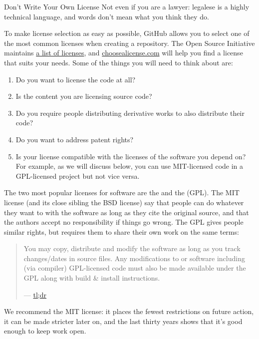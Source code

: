 \begin{aside}{Don't Write Your Own License}
  Not even if you are a lawyer:
  legalese is a highly technical language,
  and words don't mean what you think they do.
\end{aside}

To make license selection as easy as possible,
GitHub allows you to select one of the most common licenses when creating a repository.
The Open Source Initiative maintains \href{http://opensource.org/licenses}{a list of licenses},
and \href{http://choosealicense.com/}{choosealicense.com} will help you find a license that suits your needs.
Some of the things you will need to think about are:

\begin{enumerate}
\item
  Do you want to license the code at all?
\item
  Is the content you are licensing source code?
\item
  Do you require people distributing derivative works to also distribute their code?
\item
  Do you want to address patent rights?
\item
  Is your license compatible with the licenses of the software you depend on?
  For example, as we will discuss below,
  you can use MIT-licensed code in a GPL-licensed project but not vice versa.
\end{enumerate}

The two most popular licenses for software are
the  and the  (GPL).
The MIT license (and its close sibling the BSD license)
say that people can do whatever they want to with the software as long as they cite the original source,
and that the authors accept no responsibility if things go wrong.
The GPL gives people similar rights,
but requires them to share their own work on the same terms:

\begin{quote}
You may copy, distribute and modify the software as long as you track changes/dates in source files.
Any modifications to or software including (via compiler) GPL-licensed code must also be made available under the GPL
along with build \& install instructions.

--- \href{https://tldrlegal.com/license/gnu-general-public-license-v3-(gpl-3)}{tl;dr}
\end{quote}

We recommend the MIT license:
it places the fewest restrictions on future action,
it can be made stricter later on,
and the last thirty years shows that it's good enough to keep work open.

